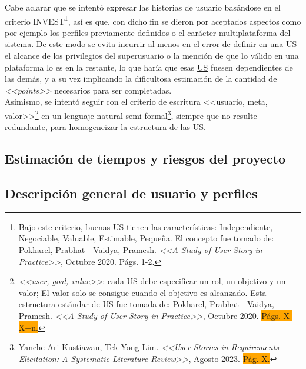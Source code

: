 \documentclass[a4paper, 12pt,twoside]{report}  %
\numberwithin{equation}{subsection} %
\begin{document}
Cabe aclarar que se intentó expresar las historias de usuario basándose en el criterio \hyperlink{INVEST}{INVEST}\footnote{Bajo este criterio, buenas \hyperlink{US}{US} tienen las características: Independiente, Negociable, Valuable, Estimable, Pequeña. El concepto fue tomado de: Pokharel, Prabhat - Vaidya, Pramesh. \textit{<<A Study of User Story in Practice>>}, Octubre 2020. Págs. 1-2.}, así es que, con dicho fin se dieron por aceptados aspectos como por ejemplo los perfiles previamente definidos o el carácter multiplataforma del sistema. De este modo se evita incurrir al menos en el error de definir en una \hyperlink{US}{US} el alcance de los privilegios del superusuario o la mención de que lo válido en una plataforma lo es en la restante, lo que haría que esas \hyperlink{US}{US} fuesen dependientes de las demás, y a su vez implicando la dificultosa estimación de la cantidad de \textit{<<points>>} necesarios para ser completadas.\\
\indent Asimismo, se intentó seguir con el criterio de escritura <<usuario, meta, valor>>\footnote{\textit{<<user, goal, value>>}: cada US debe especificar un rol, un objetivo y un valor; El valor solo se consigue cuando el objetivo es alcanzado. Esta estructura estándar de \hyperlink{US}{US} fue tomada de: Pokharel, Prabhat - Vaidya, Pramesh. \textit{<<A Study of User Story in Practice>>}, Octubre 2020. \colorbox{orange}{Págs. X-X+n.}} en un lenguaje natural semi-formal\footnote{Yanche Ari Kustiawan, Tek Yong Lim. \textit{<<User Stories in Requirements Elicitation: A Systematic Literature Review>>}, Agosto 2023. \colorbox{orange}{Pág. X.}}, siempre que no resulte redundante, para homogeneizar la estructura de las \hyperlink{US}{US}.


\subsection{Estimación de tiempos y riesgos del proyecto}
\subsection{Descripción general de usuario y perfiles}
\end{document}
